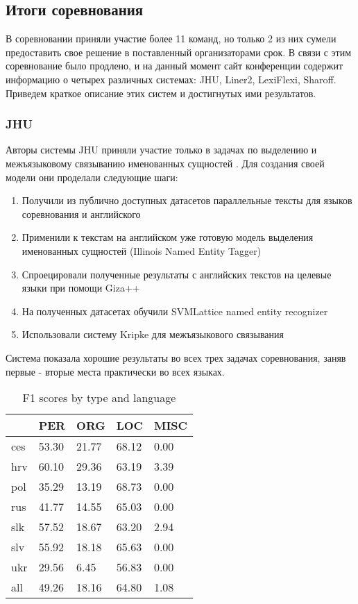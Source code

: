 \subsection{Итоги соревнования}

В соревновании приняли участие более 11 команд, но только 2 из них сумели предоставить свое решение в поставленный организаторами срок. В связи с этим соревнование было продлено, и на данный момент сайт конференции содержит информацию о четырех различных системах: JHU, Liner2, LexiFlexi, Sharoff.
Приведем краткое описание этих систем и достигнутых ими результатов.

\subsubsection{JHU}

Авторы системы JHU приняли участие только в задачах по выделению и межъязыковому связыванию именованных сущностей \cite{mayfield-mcnamee-costello:2017:BSNLP}. Для создания своей модели они проделали следующие шаги:

\begin{enumerate}
    \item Получили из публично доступных датасетов параллельные тексты для языков соревнования и английского
    \item Применили к текстам на английском уже готовую модель выделения именованных сущностей (Illinois Named Entity Tagger)
    \item Спроецировали полученные результаты с английских текстов на целевые языки при помощи  Giza++
    \item На полученных датасетах обучили SVMLattice named entity recognizer
    \item Использовали систему Kripke для межъязыкового связывания
\end{enumerate}

Система показала хорошие результаты во всех трех задачах соревнования, заняв первые - вторые места практически во всех языках.

\begin{table}[ht]
\centering
\caption{F1 scores by type and language}
\label{JHU_trump_categories}
\begin{tabular}{|l|l|l|l|l|}
\hline
    & PER   & ORG   & LOC   & MISC \\ \hline
ces & 53.30 & 21.77 & 68.12 & 0.00 \\ \hline
hrv & 60.10 & 29.36 & 63.19 & 3.39 \\ \hline
pol & 35.29 & 13.19 & 68.73 & 0.00 \\ \hline
rus & 41.77 & 14.55 & 65.03 & 0.00 \\ \hline
slk & 57.52 & 18.67 & 63.20 & 2.94 \\ \hline
slv & 55.92 & 18.18 & 65.63 & 0.00 \\ \hline
ukr & 29.56 & 6.45  & 56.83 & 0.00 \\ \hline
all & 49.26 & 18.16 & 64.80 & 1.08 \\ \hline
\end{tabular}
\end{table}

